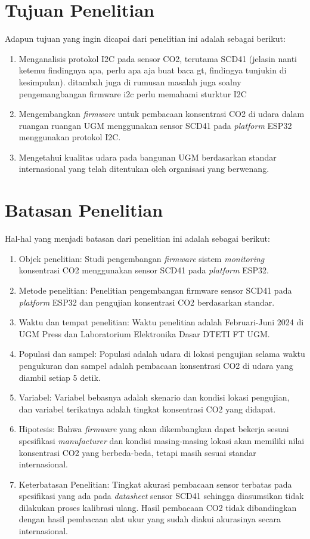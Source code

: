 \section{Tujuan Penelitian}
Adapun tujuan yang ingin dicapai dari penelitian ini adalah sebagai berikut: 

\begin{enumerate}
        \item Menganalisis protokol I2C pada sensor CO2, terutama SCD41 (jelasin nanti ketemu findingnya apa, perlu apa aja buat baca gt, findingya tunjukin di kesimpulan). ditambah juga di rumusan masalah juga soalny pengemangbangan firmware i2c perlu memahami sturktur I2C
	\item Mengembangkan \textit{firmware} untuk pembacaan konsentrasi CO2 di udara dalam ruangan ruangan UGM menggunakan sensor SCD41 pada \textit{platform} ESP32 menggunakan protokol I2C.
	\item Mengetahui kualitas udara pada bangunan UGM berdasarkan standar internasional yang telah ditentukan oleh organisasi yang berwenang.
\end{enumerate}

\section{Batasan Penelitian}
Hal-hal yang menjadi batasan dari penelitian ini adalah sebagai berikut: 

\begin{enumerate}
    \item Objek penelitian: Studi pengembangan \textit{firmware} sistem \textit{monitoring} konsentrasi CO2 menggunakan sensor SCD41 pada \textit{platform} ESP32.
    \item Metode penelitian: Penelitian pengembangan firmware  sensor SCD41 pada \textit{platform} ESP32 dan pengujian konsentrasi CO2 berdasarkan standar.
    \item Waktu dan tempat penelitian: Waktu penelitian adalah Februari-Juni 2024 di UGM Press dan Laboratorium Elektronika Dasar DTETI FT UGM.
    \item Populasi dan sampel: Populasi adalah udara di lokasi pengujian selama waktu pengukuran dan sampel adalah pembacaan konsentrasi CO2 di udara yang diambil setiap 5 detik.
    \item Variabel: Variabel bebasnya adalah skenario dan kondisi lokasi pengujian, dan variabel terikatnya adalah tingkat konsentrasi CO2 yang didapat.
    \item Hipotesis: Bahwa \textit{firmware} yang akan dikembangkan dapat bekerja sesuai spesifikasi \textit{manufacturer} dan kondisi masing-masing lokasi akan memiliki nilai konsentrasi CO2 yang berbeda-beda, tetapi masih sesuai standar internasional.
    \item Keterbatasan Penelitian: Tingkat akurasi pembacaan sensor terbatas pada  spesifikasi yang ada pada \textit{datasheet} sensor SCD41 sehingga diasumsikan tidak dilakukan proses kalibrasi ulang. Hasil pembacaan CO2 tidak dibandingkan dengan hasil pembacaan alat ukur yang sudah diakui akurasinya secara internasional.
\end{enumerate}

